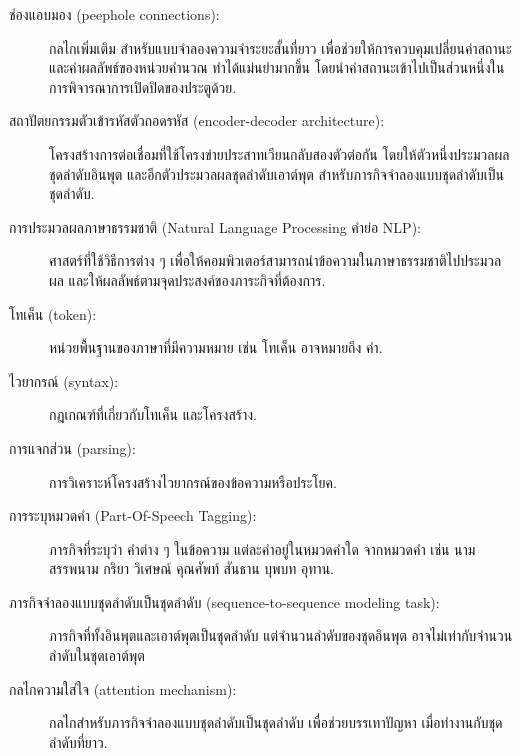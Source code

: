 \begin{description}
\item[ช่องแอบมอง (peephole connections):]
กลไกเพิ่มเติม สำหรับแบบจำลองความจำระยะสั้นที่ยาว
เพื่อช่วยให้การควบคุมเปลี่ยนค่าสถานะและค่าผลลัพธ์ของหน่วยคำนวณ
ทำได้แม่นยำมากขึ้น
โดยนำค่าสถานะเข้าไปเป็นส่วนหนึ่งในการพิจารณาการเปิดปิดของประตูด้วย.

\item[สถาปัตยกรรมตัวเข้ารหัสตัวถอดรหัส (encoder-decoder architecture):]
โครงสร้างการต่อเชื่อมที่ใช้โครงข่ายประสาทเวียนกลับสองตัวต่อกัน
โดยให้ตัวหนึ่งประมวลผลชุดลำดับอินพุต และอีกตัวประมวลผลชุดลำดับเอาต์พุต
สำหรับภารกิจจำลองแบบชุดลำดับเป็นชุดลำดับ.
	
\item[การประมวลผลภาษาธรรมชาติ (Natural Language Processing คำย่อ NLP):] 
ศาสตร์ที่ใช้วิธีการต่าง ๆ เพื่อให้คอมพิวเตอร์สามารถนำข้อความในภาษาธรรมชาติไปประมวลผล และให้ผลลัพธ์ตามจุดประสงค์ของภาระกิจที่ต้องการ.

\item[โทเค็น (token):]
หน่วยพื้นฐานของภาษาที่มีความหมาย 
เช่น โทเค็น อาจหมายถึง คำ.

\item[ไวยากรณ์ (syntax):] 
กฎเกณฑ์ที่เกี่ยวกับโทเค็น และโครงสร้าง.

\item[การแจกส่วน (parsing):]
การวิเคราะห์โครงสร้างไวยากรณ์ของข้อความหรือประโยค.

\item[การระบุหมวดคำ (Part-Of-Speech Tagging):]
ภารกิจที่ระบุว่า คำต่าง ๆ ในข้อความ แต่ละคำอยู่ในหมวดคำใด จากหมวดคำ เช่น นาม สรรพนาม กริยา วิเศษณ์ คุณศัพท์ สันธาน บุพบท อุทาน.

\item[ภารกิจจำลองแบบชุดลำดับเป็นชุดลำดับ (sequence-to-sequence modeling task):]
ภารกิจที่ทั้งอินพุตและเอาต์พุตเป็นชุดลำดับ
แต่จำนวนลำดับของชุดอินพุต อาจไม่เท่ากับจำนวนลำดับในชุดเอาต์พุต

\item[กลไกความใส่ใจ (attention mechanism):]
กลไกสำหรับภารกิจจำลองแบบชุดลำดับเป็นชุดลำดับ
เพื่อช่วยบรรเทาปัญหา เมื่อทำงานกับชุดลำดับที่ยาว.
	
\end{description}



